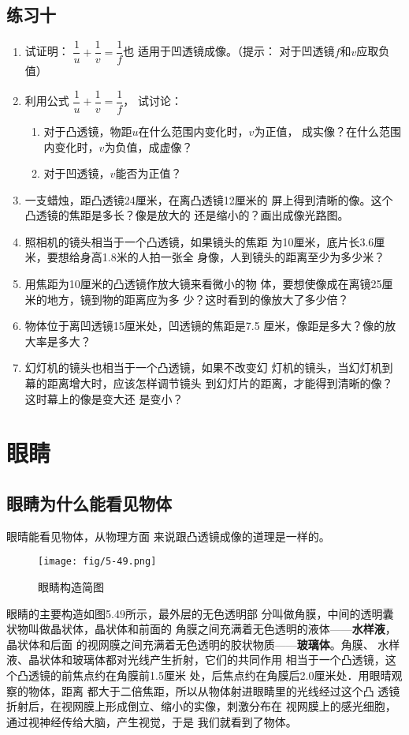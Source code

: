 \subsection*{练习十}

\begin{enumerate}
    \item 试证明：
$\dfrac{1}{u}+\dfrac{1}{v}=\dfrac{1}{f}$也
适用于凹透镜成像。（提示：
对于凹透镜$f$和$v$应取负值）
\item  利用公式
$\dfrac{1}{u}+\dfrac{1}{v}=\dfrac{1}{f}$，
试讨论：
\begin{enumerate}
    \item 对于凸透镜，物距$u$在什么范围内变化时，$v$为正值，
    成实像？在什么范围内变化时，$v$为负值，成虚像？
    \item 对于凹透镜，$v$能否为正值？
\end{enumerate}
\item 一支蜡烛，距凸透镜24厘米，在离凸透镜12厘米的
屏上得到清晰的像。这个凸透镜的焦距是多长？像是放大的
还是缩小的？画出成像光路图。
\item 照相机的镜头相当于一个凸透镜，如果镜头的焦距
为10厘米，底片长3.6厘米，要想给身高1.8米的人拍一张全
身像，人到镜头的距离至少为多少米？
\item 用焦距为10厘米的凸透镜作放大镜来看微小的物
体，要想使像成在离镜25厘米的地方，镜到物的距离应为多
少？这时看到的像放大了多少倍？
\item 物体位于离凹透镜15厘米处，凹透镜的焦距是7.5
厘米，像距是多大？像的放大率是多大？
\item 幻灯机的镜头也相当于一个凸透镜，如果不改变幻
灯机的镜头，当幻灯机到幕的距离增大时，应该怎样调节镜头
到幻灯片的距离，才能得到清晰的像？这时幕上的像是变大还
是变小？
\end{enumerate}

\section{眼睛}
\subsection{眼睛为什么能看见物体}

眼晴能看见物体，从物理方面
来说跟凸透镜成像的道理是一样的。
\begin{figure}[htp]\centering
    \texttt{[image: fig/5-49.png]}
    \caption{眼睛构造简图}
    \end{figure}

眼睛的主要构造如图5.49所示，最外层的无色透明部
分叫做角膜，中间的透明囊状物叫做晶状体，晶状体和前面的
角膜之间充满着无色透明的液体——\textbf{水样液}，晶状体和后面
的视网膜之间充满着无色透明的胶状物质——\textbf{玻璃体}。角膜、
水样液、晶状体和玻璃体都对光线产生折射，它们的共同作用
相当于一个凸透镜，这个凸透镜的前焦点约在角膜前1.5厘米
处，后焦点约在角膜后2.0厘米处．用眼晴观察的物体，距离
都大于二倍焦距，所以从物体射进眼睛里的光线经过这个凸
透镜折射后，在视网膜上形成倒立、缩小的实像，刺激分布在
视网膜上的感光细胞，通过视神经传给大脑，产生视觉，于是
我们就看到了物体。


